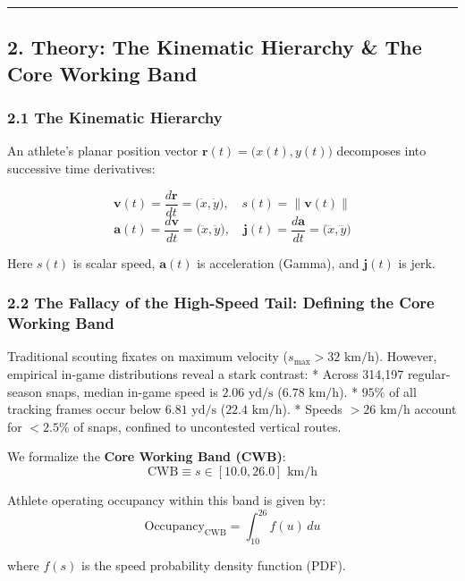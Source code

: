 \documentclass[
  letterpaper,
  DIV=11,
  numbers=noendperiod]{scrartcl}
\begin{document}
\begin{center}\rule{0.5\linewidth}{0.5pt}\end{center}

\subsection{2. Theory: The Kinematic Hierarchy \& The Core Working
Band}\label{theory-the-kinematic-hierarchy-the-core-working-band}

\subsubsection{2.1 The Kinematic
Hierarchy}\label{the-kinematic-hierarchy}

An athlete's planar position vector
\(\mathbf{r}(t) = \big(x(t), y(t)\big)\) decomposes into successive time
derivatives:

\[\mathbf{v}(t) = \frac{d\mathbf{r}}{dt} = \big(\dot{x}, \dot{y}\big), \quad s(t) = \|\mathbf{v}(t)\|\]
\[\mathbf{a}(t) = \frac{d\mathbf{v}}{dt} = \big(\ddot{x}, \ddot{y}\big), \quad \mathbf{j}(t) = \frac{d\mathbf{a}}{dt} = \big(\dddot{x}, \dddot{y}\big)\]

Here \(s(t)\) is scalar speed, \(\mathbf{a}(t)\) is acceleration
(Gamma), and \(\mathbf{j}(t)\) is jerk.

\subsubsection{2.2 The Fallacy of the High-Speed Tail: Defining the Core
Working
Band}\label{the-fallacy-of-the-high-speed-tail-defining-the-core-working-band}

Traditional scouting fixates on maximum velocity
(\(s_{\text{max}} > 32\text{ km/h}\)). However, empirical in-game
distributions reveal a stark contrast: * Across 314,197 regular-season
snaps, median in-game speed is \(2.06\text{ yd/s}\)
(\(6.78\text{ km/h}\)). * \(95\%\) of all tracking frames occur below
\(6.81\text{ yd/s}\) (\(22.4\text{ km/h}\)). * Speeds
\(>26\text{ km/h}\) account for \(<2.5\%\) of snaps, confined to
uncontested vertical routes.

We formalize the \textbf{Core Working Band (CWB)}:
\[\text{CWB} \equiv s \in [10.0, 26.0]\text{ km/h}\]

Athlete operating occupancy within this band is given by:
\[\text{Occupancy}_{\text{CWB}} = \int_{10}^{26} f(u)\,du\]

where \(f(s)\) is the speed probability density function (PDF).
\end{document}
